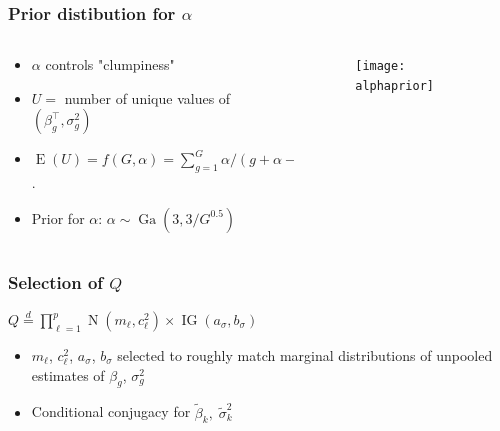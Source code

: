 \documentclass{beamer}
\newcommand{\op}{\operatorname}
\begin{document}
\begin{frame}%
  \frametitle{Prior distibution for $\alpha$}
    \begin{columns}
    \begin{column}{.5\textwidth}
      {\footnotesize
      \begin{itemize}
        \item $\alpha$ controls "clumpiness"
        \pause \item $U=$ number of unique values of $(\beta_g^\top,\sigma^2_g)$
        \pause \item $\op{E}(U) = f(G,\alpha) = \sum_{g=1}^G \alpha/(g + \alpha - 1)$.
        \pause \item Prior for $\alpha$: $\alpha \sim \op{Ga}(3,3/G^{0.5})$
      \end{itemize}
      }
    \end{column}
    \begin{column}{.65\textwidth}
      \begin{figure}
        \centering
        \pause \texttt{[image: alphaprior]}
      \end{figure}
    \end{column}
  \end{columns}
\end{frame}

\begin{frame}%
  \frametitle{Selection of $Q$}
  $Q \stackrel{d}{=} \prod_{\ell=1}^p\op{N}(m_\ell,c^2_\ell)\times\op{IG}(a_\sigma,b_\sigma)$\\

  \vspace{.5cm}

  \begin{itemize}
    \pause \item $m_\ell$, $c^2_\ell$, $a_\sigma$, $b_\sigma$ selected to roughly match marginal distributions of unpooled estimates of $\beta_g$, $\sigma_g^2$
    \pause \item Conditional conjugacy for $\tilde{\beta}_k,\; \tilde{\sigma}_k^2$
  \end{itemize}
\end{frame}
\end{document}
